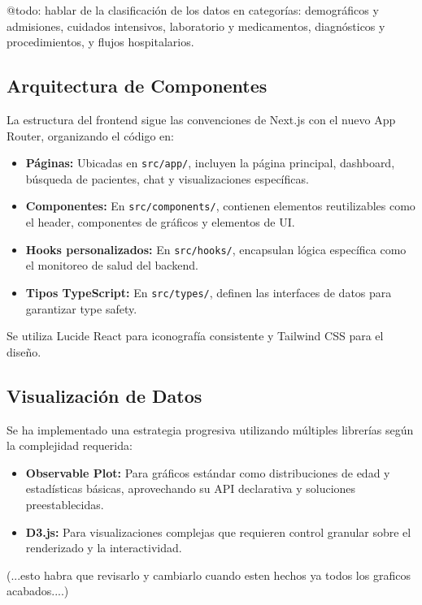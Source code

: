 @todo: hablar de la clasificación de los datos en categorías: demográficos y admisiones, cuidados intensivos, laboratorio y medicamentos, diagnósticos y procedimientos, y flujos hospitalarios.

\subsection{Arquitectura de Componentes}

La estructura del frontend sigue las convenciones de Next.js con el nuevo App Router, organizando el código en:

\begin{itemize}
\item \textbf{Páginas:} Ubicadas en \texttt{src/app/}, incluyen la página principal, dashboard, búsqueda de pacientes, chat y visualizaciones específicas.
\item \textbf{Componentes:} En \texttt{src/components/}, contienen elementos reutilizables como el header, componentes de gráficos y elementos de UI.
\item \textbf{Hooks personalizados:} En \texttt{src/hooks/}, encapsulan lógica específica como el monitoreo de salud del backend.
\item \textbf{Tipos TypeScript:} En \texttt{src/types/}, definen las interfaces de datos para garantizar type safety.
\end{itemize}

Se utiliza Lucide React para iconografía consistente y Tailwind CSS para el diseño.

\subsection{Visualización de Datos}

Se ha implementado una estrategia progresiva utilizando múltiples librerías según la complejidad requerida:

\begin{itemize}
\item \textbf{Observable Plot:} Para gráficos estándar como distribuciones de edad y estadísticas básicas, aprovechando su API declarativa y soluciones preestablecidas.
\item \textbf{D3.js:} Para visualizaciones complejas que requieren control granular sobre el renderizado y la interactividad.
\end{itemize}

(...esto habra que revisarlo y cambiarlo cuando esten hechos ya todos los graficos acabados....)

